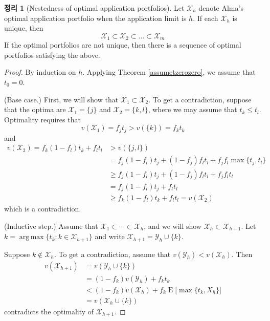 \documentclass[12pt]{article} %
\DeclareMathOperator*{\argmax}{arg\,max}
\newtheorem{theorem}{Theorem}
\theoremstyle{definition}
\newtheorem{theorem}{정리}
\theoremstyle{definition}
\begin{document}
\begin{theorem}[Nestedness of optimal application portfolios] \label{nestedapplication}
Let $\mathcal{X}_h$ denote Alma’s optimal application portfolio when the application limit is $h$. If each $\mathcal{X}_h$ is unique, then
\begin{equation}
\mathcal{X}_1 \subset \mathcal{X}_2\subset \dots \subset \mathcal{X}_m
\end{equation}
If the optimal portfolios are not unique, then there is a sequence of optimal portfolios satisfying the above.
\end{theorem}
\begin{proof} By induction on $h$. Applying Theorem \ref{assumetzerozero}, we assume that $t_0 = 0$. 

(Base case.) First, we will show that $\mathcal{X}_1 \subset \mathcal{X}_2$. To get a contradiction, suppose that the optima are $\mathcal{X}_1 = \{j\}$ and $\mathcal{X}_2 = \{k, l\}$, where we may assume that $t_k \leq t_l$. Optimality requires that
\begin{equation}v(\mathcal{X}_1 )  = f_j t_j > v(\{k\}) = f_k t_k\end{equation}
and
\begin{align}
v(\mathcal{X}_2) =  f_k (1- f_l) t_k + f_l t_l &> v(\{j, l\}) \\
& = f_j (1- f_l) t_j + (1- f_j) f_l t_l + f_j f_l \max\{t_j, t_l\} \\
&\geq  f_j (1- f_l) t_j + (1- f_j) f_l t_l + f_j f_l  t_l \\
&= f_j (1- f_l) t_j + f_l t_l  \\
&\geq f_k (1- f_l) t_k + f_l t_l  = v(\mathcal{X}_2)
\end{align}
which is a contradiction.

(Inductive step.) Assume that $\mathcal{X}_1 \subset \cdots \subset \mathcal{X}_h$, and we will show $\mathcal{X}_h \subset \mathcal{X}_{h+1}$. Let $k = \argmax\{ t_k: k \in \mathcal{X}_{h+1}\}$ and write $\mathcal{X}_{h+1} = \mathcal{Y}_{h} \cup \{k\}$.

Suppose $k \notin \mathcal{X}_h$.  To get a contradiction, assume that $v(\mathcal{Y}_h) < v(\mathcal{X}_h)$. Then
\begin{align}
v(\mathcal{X}_{h+1})&= v(\mathcal{Y}_{h} \cup \{k\}) \\
&= (1 - f_k) v(\mathcal{Y}_h) + f_k t_k \\
& < (1 - f_k) v(\mathcal{X}_h) + f_k \operatorname{E}\bigl[ \max\{t_k, X_h\}\bigr]\\
&=  v(\mathcal{X}_h\cup \{k\})
\end{align}
contradicts the optimality of $\mathcal{X}_{h+1}$.


\end{proof}
\end{document}
